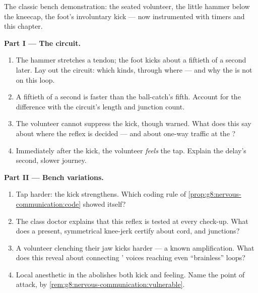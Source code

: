 \begin{problem}\label{pb:g8:nervous-communication:1}
The classic bench demonstration: the seated volunteer,
the little hammer below the kneecap, the foot's involuntary
kick --- now instrumented with timers and this chapter.

\medskip\noindent\textbf{Part I --- The circuit.}
\begin{enumerate}
  \item The hammer stretches a tendon; the foot kicks
        about a fiftieth of a second later. Lay out the
        circuit: which  kinds, through where ---
        and why the  is not on this loop.
  \item A fiftieth of a second is faster than the
        ball-catch's fifth. Account for the difference
        with the circuit's length and junction count.
  \item The volunteer cannot suppress the kick, though
        warned. What does this say about where the reflex
        is decided --- and about one-way traffic at the
        ?
  \item Immediately after the kick, the volunteer
        \emph{feels} the tap. Explain the delay's
        second, slower journey.
\end{enumerate}

\medskip\noindent\textbf{Part II --- Bench variations.}
\begin{enumerate}[resume]
  \item Tap harder: the kick strengthens. Which coding
        rule of \cref{prop:g8:nervous-communication:code}
        showed itself?
  \item The class doctor explains that this reflex is
        tested at every check-up. What does a present,
        symmetrical knee-jerk certify about cord, 
        and junctions?
  \item A volunteer clenching their jaw kicks harder ---
        a known amplification. What does this reveal
        about connecting ' voices reaching even
        ``brainless'' loops?
  \item Local anesthetic in the  abolishes both kick
        and feeling. Name the point of attack, by
        \cref{rem:g8:nervous-communication:vulnerable}.
\end{enumerate}


\end{problem}
